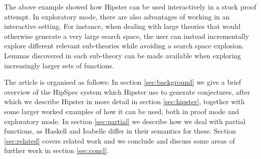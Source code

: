 

% 
The above example showed how Hipster can be used interactively in a stuck proof attempt. In exploratory mode, there are also advantages of working in an interactive setting. For instance, when dealing with large theories that would otherwise generate a very large search space, the user can instead incrementally explore different relevant sub-theories while avoiding a search space explosion. Lemmas discovered in each sub-theory can be made available when exploring increasingly larger sets of functions. 

The article is organised as follows: In section \ref{sec:background} we give a brief overview of the HipSpec system which Hipster use to generate conjectures, after which we describe Hipster in more detail in section \ref{sec:hipster}, together with some larger worked examples of how it can be used, both in proof mode and exploratory mode. In section \ref{sec:partial} we describe how we deal with partial functions, as Haskell and Isabelle differ in their semantics for these. Section \ref{sec:related} covers related work and we conclude and discuss some areas of further work in section \ref{sec:concl}. 
